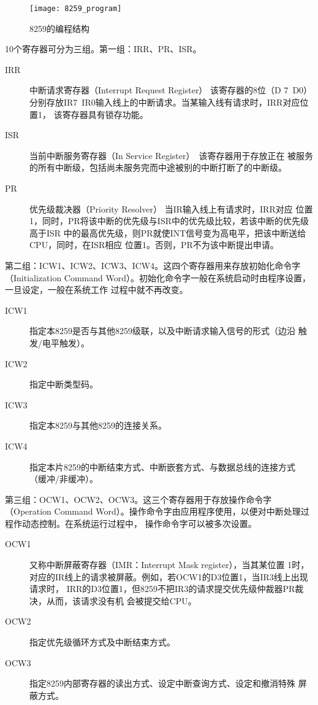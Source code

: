 \begin{figure}[H]
	\centering
	\texttt{[image: 8259\_program]}
	\caption{8259的编程结构}
	\label{fig:8259_program}
\end{figure}

10个寄存器可分为三组。第一组：IRR、PR、ISR。

\begin{description}
	\item[IRR] 中断请求寄存器（Interrupt Request Register） 该寄存器的8位（D
	7~D0）分别存放IR7~IR0输入线上的中断请求。当某输入线有请求时，IRR对应位置1，
	该寄存器具有锁存功能。
	\item[ISR] 当前中断服务寄存器（In Service Register）　该寄存器用于存放正在
	被服务的所有中断级，包括尚未服务完而中途被别的中断打断了的中断级。
	\item[PR] 优先级裁决器（Priority Resolver） 当IR输入线上有请求时，IRR对应
	位置1，同时，PR将该中断的优先级与ISR中的优先级比较，若该中断的优先级高于ISR
	中的最高优先级，则PR就使INT信号变为高电平，把该中断送给CPU，同时，在ISR相应
	位置1。否则，PR不为该中断提出申请。
\end{description}

第二组：ICW1、ICW2、ICW3、ICW4。这四个寄存器用来存放初始化命令字（Initialization 
Command Word）。初始化命令字一般在系统启动时由程序设置，一旦设定，一般在系统工作
过程中就不再改变。

\begin{description}
	\item[ICW1] 指定本8259是否与其他8259级联，以及中断请求输入信号的形式（边沿
	触发/电平触发）。
	\item[ICW2] 指定中断类型码。
	\item[ICW3] 指定本8259与其他8259的连接关系。
	\item[ICW4] 指定本片8259的中断结束方式、中断嵌套方式、与数据总线的连接方式
	（缓冲/非缓冲）。
\end{description}

第三组：OCW1、OCW2、OCW3。这三个寄存器用于存放操作命令字（Operation Command 
Word）。操作命令字由应用程序使用，以便对中断处理过程作动态控制。在系统运行过程中，
操作命令字可以被多次设置。

\begin{description}
	\item[OCW1] 又称中断屏蔽寄存器（IMR：Interrupt Mask register），当其某位置
	1时，对应的IR线上的请求被屏蔽。例如，若OCW1的D3位置1，当IR3线上出现请求时，
	IRR的D3位置1，但8259不把IR3的请求提交优先级仲裁器PR裁决，从而，该请求没有机
	会被提交给CPU。
	\item[OCW2] 指定优先级循环方式及中断结束方式。
	\item[OCW3] 指定8259内部寄存器的读出方式、设定中断查询方式、设定和撤消特殊
	屏蔽方式。
\end{description}

